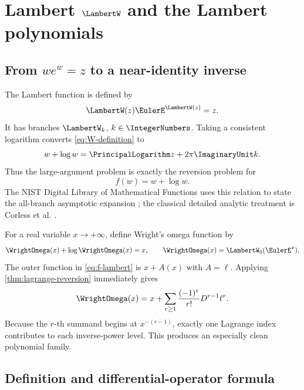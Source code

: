 \documentclass[11pt,oneside]{article}
\numberwithin{equation}{section}
\theoremstyle{definition}
\begin{document}
\section{Lambert \texorpdfstring{\(\LambertW\)}{W} and the Lambert polynomials}\label{sec:lambert}

\subsection{From \(we^w=z\) to a near-identity inverse}

The Lambert function is defined by
\begin{equation}\label{eq:W-definition}
  \LambertW(z)\EulerE^{\LambertW(z)}=z.
\end{equation}
It has branches \(\LambertW_k\), \(k\in\IntegerNumbers\).  Taking a consistent logarithm converts
\eqref{eq:W-definition} to
\begin{equation}\label{eq:W-log-equation}
  w+\log w=\PrincipalLogarithm z+2\pi \ImaginaryUnit k.
\end{equation}
Thus the large-argument problem is exactly the reversion problem for
\begin{equation}\label{eq:f-lambert}
  f(w)=w+\log w.
\end{equation}
The NIST Digital Library of Mathematical Functions uses this relation to state
the all-branch asymptotic expansion \cite{DLMFLambert}; the classical detailed
analytic treatment is Corless et al. \cite{Corless1996}.

For a real variable \(x\to+\infty\), define Wright's omega function by
\begin{equation}\label{eq:omega-def}
  \WrightOmega(x)+\log\WrightOmega(x)=x,
  \qquad \WrightOmega(x)=\LambertW_0(\EulerE^x).
\end{equation}
The outer function in \eqref{eq:f-lambert} is \(x+A(x)\) with \(A=\ell\).
Applying \cref{thm:lagrange-reversion} immediately gives
\begin{equation}\label{eq:omega-lagrange}
  \WrightOmega(x)=x+\sum_{r\ge1}\frac{(-1)^r}{r!}
  D^{r-1}\ell^r.
\end{equation}
Because the \(r\)-th summand begins at \(x^{-(r-1)}\), exactly one Lagrange
index contributes to each inverse-power level.  This produces an especially
clean polynomial family.

\subsection{Definition and differential-operator formula}
\end{document}
